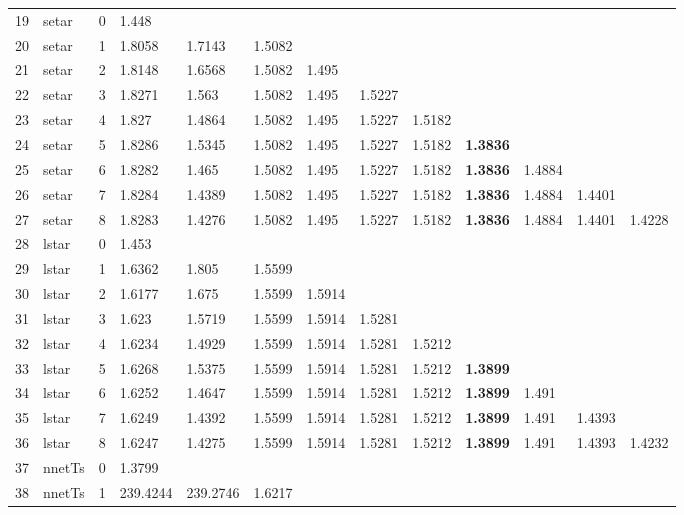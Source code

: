 \documentclass[10pt,a4paper]{article}
\begin{document}
\begin{table}[ht]
\begin{tabular}{rlrllllllllll}
   \hline
19 & setar &     0 & 1.448 &  &  &  &  &  &  &  &  &  \\ 
  20 & setar &     1 & 1.8058 & 1.7143 & 1.5082 &  &  &  &  &  &  &  \\ 
  21 & setar &     2 & 1.8148 & 1.6568 & 1.5082 & 1.495 &  &  &  &  &  &  \\ 
  22 & setar &     3 & 1.8271 & 1.563 & 1.5082 & 1.495 & 1.5227 &  &  &  &  &  \\ 
  23 & setar &     4 & 1.827 & 1.4864 & 1.5082 & 1.495 & 1.5227 & 1.5182 &  &  &  &  \\ 
  24 & setar &     5 & 1.8286 & 1.5345 & 1.5082 & 1.495 & 1.5227 & 1.5182 & \textbf{1.3836} &  &  &  \\ 
  25 & setar &     6 & 1.8282 & 1.465 & 1.5082 & 1.495 & 1.5227 & 1.5182 & \textbf{1.3836} & 1.4884 &  &  \\ 
  26 & setar &     7 & 1.8284 & 1.4389 & 1.5082 & 1.495 & 1.5227 & 1.5182 & \textbf{1.3836} & 1.4884 & 1.4401 &  \\ 
  27 & setar &     8 & 1.8283 & 1.4276 & 1.5082 & 1.495 & 1.5227 & 1.5182 & \textbf{1.3836} & 1.4884 & 1.4401 & 1.4228 \\ 
   \hline
28 & lstar &     0 & 1.453 &  &  &  &  &  &  &  &  &  \\ 
  29 & lstar &     1 & 1.6362 & 1.805 & 1.5599 &  &  &  &  &  &  &  \\ 
  30 & lstar &     2 & 1.6177 & 1.675 & 1.5599 & 1.5914 &  &  &  &  &  &  \\ 
  31 & lstar &     3 & 1.623 & 1.5719 & 1.5599 & 1.5914 & 1.5281 &  &  &  &  &  \\ 
  32 & lstar &     4 & 1.6234 & 1.4929 & 1.5599 & 1.5914 & 1.5281 & 1.5212 &  &  &  &  \\ 
  33 & lstar &     5 & 1.6268 & 1.5375 & 1.5599 & 1.5914 & 1.5281 & 1.5212 & \textbf{1.3899} &  &  &  \\ 
  34 & lstar &     6 & 1.6252 & 1.4647 & 1.5599 & 1.5914 & 1.5281 & 1.5212 & \textbf{1.3899} & 1.491 &  &  \\ 
  35 & lstar &     7 & 1.6249 & 1.4392 & 1.5599 & 1.5914 & 1.5281 & 1.5212 & \textbf{1.3899} & 1.491 & 1.4393 &  \\ 
  36 & lstar &     8 & 1.6247 & 1.4275 & 1.5599 & 1.5914 & 1.5281 & 1.5212 & \textbf{1.3899} & 1.491 & 1.4393 & 1.4232 \\ 
   \hline
37 & nnetTs &     0 & 1.3799 &  &  &  &  &  &  &  &  &  \\ 
  38 & nnetTs &     1 & 239.4244 & 239.2746 & 1.6217 &  &  &  &  &  &  &  \\ 

\end{tabular}
\end{table}
\end{document}
